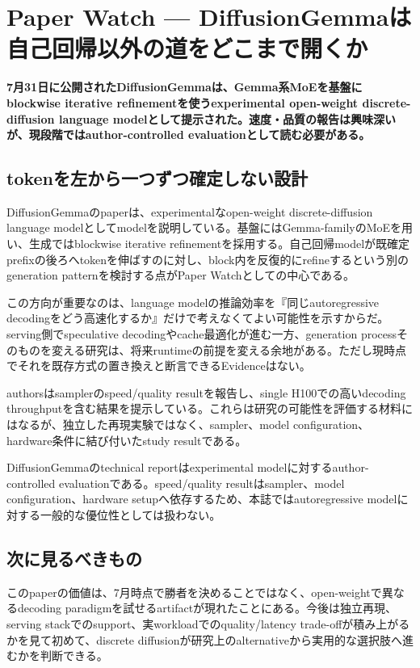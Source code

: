 \section{Paper Watch — DiffusionGemmaは自己回帰以外の道をどこまで開くか}
\noindent\textbf{7月31日に公開されたDiffusionGemmaは、Gemma系MoEを基盤にblockwise iterative refinementを使うexperimental open-weight discrete-diffusion language modelとして提示された。速度・品質の報告は興味深いが、現段階ではauthor-controlled evaluationとして読む必要がある。}\autocite{src-ab19992e4c80}

\subsection{tokenを左から一つずつ確定しない設計}

DiffusionGemmaのpaperは、experimentalなopen-weight discrete-diffusion language modelとしてmodelを説明している。基盤にはGemma-familyのMoEを用い、生成ではblockwise iterative refinementを採用する。自己回帰modelが既確定prefixの後ろへtokenを伸ばすのに対し、block内を反復的にrefineするという別のgeneration patternを検討する点がPaper Watchとしての中心である。\autocite{src-ab19992e4c80}


この方向が重要なのは、language modelの推論効率を『同じautoregressive decodingをどう高速化するか』だけで考えなくてよい可能性を示すからだ。serving側でspeculative decodingやcache最適化が進む一方、generation processそのものを変える研究は、将来runtimeの前提を変える余地がある。ただし現時点でそれを既存方式の置き換えと断言できるEvidenceはない。\autocite{src-ab19992e4c80}


authorsはsamplerのspeed/quality resultを報告し、single H100での高いdecoding throughputを含む結果を提示している。これらは研究の可能性を評価する材料にはなるが、独立した再現実験ではなく、sampler、model configuration、hardware条件に結び付いたstudy resultである。\autocite{src-ab19992e4c80}


\begin{claimboundary}
DiffusionGemmaのtechnical reportはexperimental modelに対するauthor-controlled evaluationである。speed/quality resultはsampler、model configuration、hardware setupへ依存するため、本誌ではautoregressive modelに対する一般的な優位性としては扱わない。\autocite{src-ab19992e4c80}
\end{claimboundary}

\subsection{次に見るべきもの}

このpaperの価値は、7月時点で勝者を決めることではなく、open-weightで異なるdecoding paradigmを試せるartifactが現れたことにある。今後は独立再現、serving stackでのsupport、実workloadでのquality/latency trade-offが積み上がるかを見て初めて、discrete diffusionが研究上のalternativeから実用的な選択肢へ進むかを判断できる。\autocite{src-ab19992e4c80}

